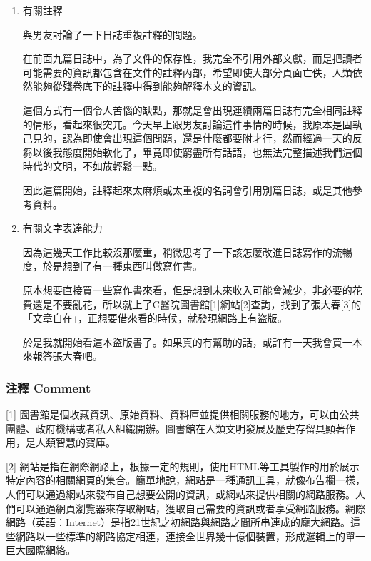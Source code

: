\documentclass[a5paper, 12pt
]{book}
\begin{document}
\begin{enumerate}
\def\labelenumi{\arabic{enumi}.}
\item
  有關註釋

  與男友討論了一下日誌重複註釋的問題。

  在前面九篇日誌中，為了文件的保存性，我完全不引用外部文獻，而是把讀者可能需要的資訊都包含在文件的註釋內部，希望即使大部分頁面亡佚，人類依然能夠從殘卷底下的註釋中得到能夠解釋本文的資訊。

  這個方式有一個令人苦惱的缺點，那就是會出現連續兩篇日誌有完全相同註釋的情形，看起來很突兀。今天早上跟男友討論這件事情的時候，我原本是固執己見的，認為即使會出現這個問題，還是什麼都要附才行，然而經過一天的反芻以後我態度開始軟化了，畢竟即使窮盡所有話語，也無法完整描述我們這個時代的文明，不如放輕鬆一點。

  因此這篇開始，註釋起來太麻煩或太重複的名詞會引用別篇日誌，或是其他參考資料。
\item
  有關文字表達能力

  因為這幾天工作比較沒那麼重，稍微思考了一下該怎麼改進日誌寫作的流暢度，於是想到了有一種東西叫做寫作書。

  原本想要直接買一些寫作書來看，但是想到未來收入可能會減少，非必要的花費還是不要亂花，所以就上了C醫院圖書館{[}1{]}網站{[}2{]}查詢，找到了張大春{[}3{]}的「文章自在」，正想要借來看的時候，就發現網路上有盜版。

  於是我就開始看這本盜版書了。如果真的有幫助的話，或許有一天我會買一本來報答張大春吧。
\end{enumerate}

\hypertarget{ux6ce8ux91cb-comment-3}{%
\subsubsection{注釋 Comment}\label{ux6ce8ux91cb-comment-3}}

{[}1{]}
圖書館是個收藏資訊、原始資料、資料庫並提供相關服務的地方，可以由公共團體、政府機構或者私人組織開辦。圖書館在人類文明發展及歷史存留具顯著作用，是人類智慧的寶庫。

{[}2{]}
網站是指在網際網路上，根據一定的規則，使用HTML等工具製作的用於展示特定內容的相關網頁的集合。簡單地說，網站是一種通訊工具，就像布告欄一樣，人們可以通過網站來發布自己想要公開的資訊，或網站來提供相關的網路服務。人們可以通過網頁瀏覽器來存取網站，獲取自己需要的資訊或者享受網路服務。網際網路（英語：Internet）是指21世紀之初網路與網路之間所串連成的龐大網路。這些網路以一些標準的網路協定相連，連接全世界幾十億個裝置，形成邏輯上的單一巨大國際網絡。
\end{document}
